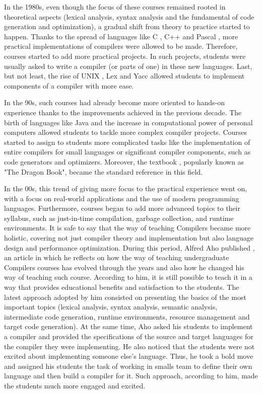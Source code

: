In the 1980s, even though the focus of these courses remained rooted in theoretical aspects (lexical analysis, syntax analysis and the fundamental of code generation and optimization), a gradual shift from theory to practice started to happen. Thanks to the spread of languages like C \cite{kernighan1988c}, C++ \cite{strousrup2000c++} and Pascal \cite{wirth1971programming}, more practical implementations of compilers were allowed to be made. Therefore, courses started to add more practical projects. In such projects, students were usually asked to write a compiler (or parts of one) in these new languages. Last, but not least, the rise of UNIX \cite{ritchie1978unix}, Lex \cite{lesk1975lex} and Yacc \cite{johnson1975yacc} allowed students to implement components of a compiler with more ease.

In the 90s, such courses had already become more oriented to hands-on experience thanks to the improvements achieved in the previous decade. The birth of languages like Java \cite{java_17_official_specification} and the increase in computational power of personal computers allowed students to tackle more complex compiler projects. Courses started to assign to students more complicated tasks like the implementation of entire compilers for small languages or significant compiler components, such as code generators and optimizers. Moreover, the textbook \cite{aho1986compilers}, popularly known as "The Dragon Book", became the standard reference in this field.

In the 00s, this trend of giving more focus to the practical experience went on, with a focus on real-world applications and the use of modern programming languages. Furthermore, courses began to add more advanced topics to their syllabus, such as just-in-time compilation, garbage collection, and runtime environments. It is safe to say that the way of teaching Compilers became more holistic, covering not just compiler theory and implementation but also language design and performance optimization. During this period, Alfred Aho published \cite{aho2008teaching}, an article in which he reflects on how the way of teaching undergraduate Compilers courses has evolved through the years and also how he changed his way of teaching such course. According to him, it is still possible to teach it in a way that provides educational benefits and satisfaction to the students. The latest approach adopted by him consisted on presenting the basics of the most important topics (lexical analysis, syntax analysis, semantic analysis, intermediate code generation, runtime environments, resource management and target code generation). At the same time, Aho asked his students to implement a compiler and provided the specifications of the source and target languages for the compiler they were implementing. He also noticed that the students were not excited about implementing someone else's language. Thus, he took a bold move and assigned his students the task of working in smalls team to define their own
language and then build a compiler for it. Such approach, according to him, made the students much more engaged and excited.

